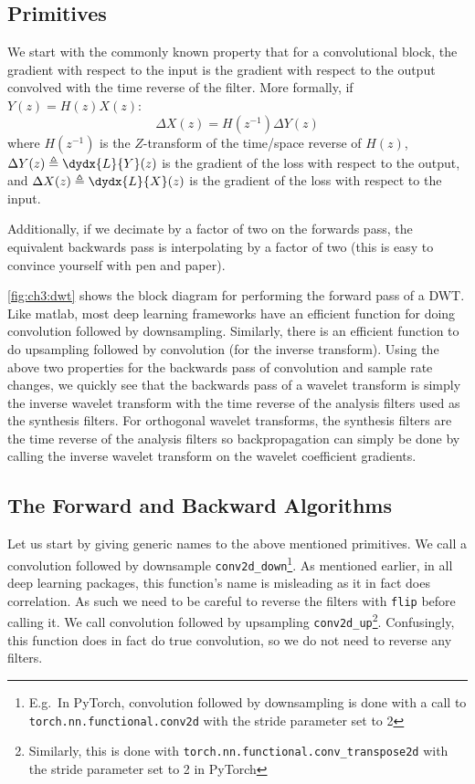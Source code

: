 \subsection{Primitives}
We start with the commonly known property that for a convolutional block, the
gradient with respect to the input is the gradient with respect to the output
convolved with the time reverse of the filter. More formally, if 
$Y(z) = H(z) X(z)$:
%
\begin{equation}\label{eq:ch3:backprop}
  \Delta X(z) = H(z^{-1}) \Delta Y(z)
\end{equation}
%
where $H(z^{-1})$ is the $Z$-transform of the time/space reverse of $H(z)$,
$\Delta Y(z) \triangleq \dydx{L}{Y}(z)$ is the gradient of the loss with respect
to the output, and $\Delta X(z) \triangleq \dydx{L}{X}(z)$ is the gradient of
the loss with respect to the input. 

Additionally, if we decimate by a factor of two on the forwards pass, the
equivalent backwards pass is interpolating by a factor of two (this is easy to
convince yourself with pen and paper).

\autoref{fig:ch3:dwt} shows the block diagram for performing the forward pass of
a DWT. Like matlab, most deep learning frameworks have an efficient function for
doing convolution followed by downsampling. Similarly, there is an efficient
function to do upsampling followed by convolution (for the inverse transform).
Using the above two properties for the backwards pass of convolution and sample
rate changes, we quickly see that the backwards pass of a wavelet transform is
simply the inverse wavelet transform with the time reverse of the analysis
filters used as the synthesis filters. For orthogonal wavelet transforms, the
synthesis filters are the time reverse of the analysis filters so
backpropagation can simply be done by calling the inverse wavelet transform on
the wavelet coefficient gradients.

\subsection{The Forward and Backward Algorithms}
Let us start by giving generic names to the above mentioned primitives. We call
a convolution followed by downsample \texttt{conv2d_down}\footnote{E.g.\ In
PyTorch, convolution followed by downsampling is done with a call to
\texttt{torch.nn.functional.conv2d} with the stride parameter set to 2}. As
mentioned earlier, in all deep learning packages, this function's name is misleading as
it in fact does correlation. As such we need to be careful to reverse the
filters with \texttt{flip} before calling it. We call convolution followed by
upsampling \texttt{conv2d_up}\footnote{Similarly, this is done with 
\texttt{torch.nn.functional.conv_transpose2d} with the stride parameter set to
2 in PyTorch}. Confusingly, this function does in fact do true convolution, so
we do not need to reverse any filters. 

